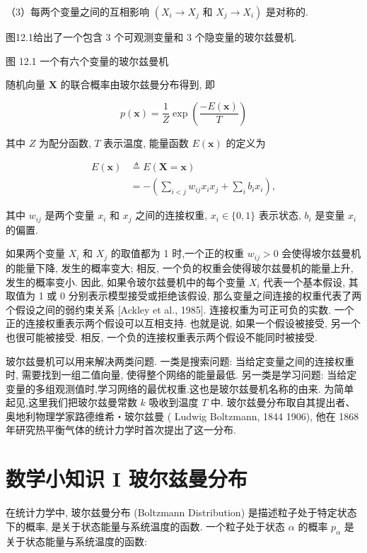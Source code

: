 \documentclass[10pt]{article}
\begin{document}
（3）每两个变量之间的互相影响 $\left(X_{i} \rightarrow X_{j}\right.$ 和 $\left.X_{j} \rightarrow X_{i}\right)$ 是对称的.

图12.1给出了一个包含 3 个可观测变量和 3 个隐变量的玻尔兹曼机.



图 12.1 一个有六个变量的玻尔兹曼机

随机向量 $\boldsymbol{X}$ 的联合概率由玻尔兹曼分布得到, 即


\begin{equation*}
p(\boldsymbol{x})=\frac{1}{Z} \exp \left(\frac{-E(\boldsymbol{x})}{T}\right) \tag{12.1}
\end{equation*}


其中 $Z$ 为配分函数, $T$ 表示温度, 能量函数 $E(\boldsymbol{x})$ 的定义为


\begin{align*}
E(\boldsymbol{x}) & \triangleq E(\boldsymbol{X}=\boldsymbol{x}) \\
& =-\left(\sum_{i<j} w_{i j} x_{i} x_{j}+\sum_{i} b_{i} x_{i}\right), \tag{12.2}
\end{align*}


其中 $w_{i j}$ 是两个变量 $x_{i}$ 和 $x_{j}$ 之间的连接权重, $x_{i} \in\{0,1\}$ 表示状态, $b_{i}$ 是变量 $x_{i}$的偏置.

如果两个变量 $X_{i}$ 和 $X_{j}$ 的取值都为 1 时,一个正的权重 $w_{i j}>0$ 会使得坡尔兹曼机的能量下降, 发生的概率变大; 相反, 一个负的权重会使得玻尔兹曼机的能量上升, 发生的概率变小. 因此, 如果令玻尔兹曼机中的每个变量 $X_{i}$ 代表一个基本假设, 其取值为 1 或 0 分别表示模型接受或拒绝该假设, 那么变量之间连接的权重代表了两个假设之间的弱约束关系 [Ackley et al., 1985]. 连接权重为可正可负的实数. 一个正的连接权重表示两个假设可以互相支持. 也就是说, 如果一个假设被接受, 另一个也很可能被接受. 相反, 一个负的连接权重表示两个假设不能同时被接受.

玻尔兹曼机可以用来解决两类问题. 一类是搜索问题: 当给定变量之间的连接权重时, 需要找到一组二值向量, 使得整个网络的能量最低. 另一类是学习问题: 当给定变量的多组观测值时,学习网络的最优权重.这也是玻尔兹曼机名称的由来. 为简单起见,这里我们把玻尔兹曼常数 $k$ 吸收到温度 $T$ 中. 玻尔兹曼分布取自其提出者、奥地利物理学家路德维希・玻尔兹曼 ( Ludwig Boltzmann, 1844 1906), 他在 1868 年研究热平衡气体的统计力学时首次提出了这一分布.

\section*{数学小知识 I 玻尔兹曼分布}
在统计力学中, 玻尔兹曼分布 (Boltzmann Distribution) 是描述粒子处于特定状态下的概率, 是关于状态能量与系统温度的函数. 一个粒子处于状态 $\alpha$ 的概率 $p_{\alpha}$ 是关于状态能量与系统温度的函数:
\end{document}
